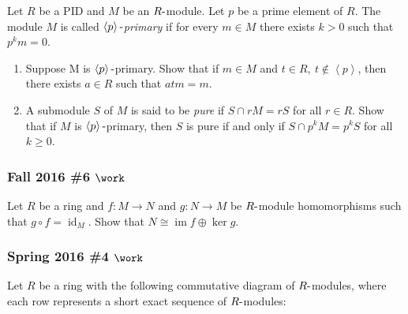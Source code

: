 Let \(R\) be a PID and \(M\) be an \(R{\hbox{-}}\)module. Let \(p\) be a
prime element of \(R\). The module \(M\) is called
\emph{\(\left\langle{p}\right\rangle{\hbox{-}}\)primary} if for every
\(m \in M\) there exists \(k > 0\) such that \(p^k m = 0\).

\begin{enumerate}
\def\labelenumi{\alph{enumi}.}
\item
  Suppose M is \(\left\langle{p}\right\rangle{\hbox{-}}\)primary. Show
  that if \(m \in M\) and
  \(t \in R, ~t \not\in \left\langle{p}\right\rangle\), then there
  exists \(a \in R\) such that \(atm = m\).
\item
  A submodule \(S\) of \(M\) is said to be \emph{pure} if
  \(S \cap r M = rS\) for all \(r \in R\). Show that if \(M\) is
  \(\left\langle{p}\right\rangle{\hbox{-}}\)primary, then \(S\) is pure
  if and only if \(S \cap p^k M = p^k S\) for all \(k \geq 0\).
\end{enumerate}

\hypertarget{fall-2016-6-work}{%
\subsubsection{\texorpdfstring{Fall 2016 \#6
\(\work\)}{Fall 2016 \#6 \textbackslash work}}\label{fall-2016-6-work}}

Let \(R\) be a ring and \(f: M\to N\) and \(g: N\to M\) be
\(R{\hbox{-}}\)module homomorphisms such that
\(g\circ f = \operatorname{id}_M\). Show that
\(N\cong \operatorname{im}f \oplus \ker g\).

\hypertarget{spring-2016-4-work}{%
\subsubsection{\texorpdfstring{Spring 2016 \#4
\(\work\)}{Spring 2016 \#4 \textbackslash work}}\label{spring-2016-4-work}}

Let \(R\) be a ring with the following commutative diagram of
\(R{\hbox{-}}\)modules, where each row represents a short exact sequence
of \(R{\hbox{-}}\)modules:

\begin{center}
\end{center}

